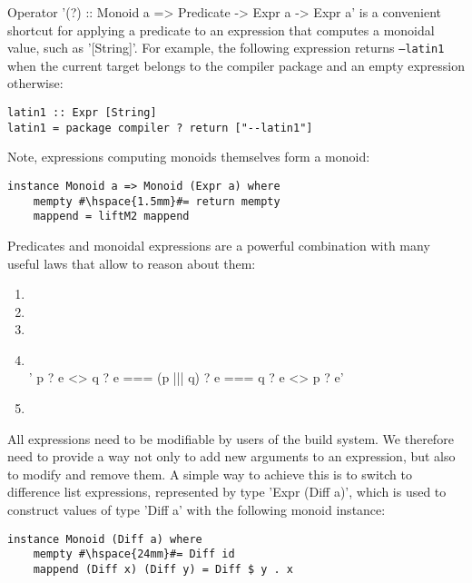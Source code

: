 Operator \lst'(?) :: Monoid a => Predicate -> Expr a -> Expr a' is a
convenient shortcut for applying a predicate to an expression that computes a monoidal value, such
as \lst'[String]'. For example, the following expression returns
\texttt{--latin1} when the current target belongs to the compiler package and an empty expression otherwise:

\begin{lstlisting}
latin1 :: Expr [String]
latin1 = package compiler ? return ["--latin1"]
\end{lstlisting}

\noindent Note, expressions computing monoids themselves form a monoid:

\begin{lstlisting}
instance Monoid a => Monoid (Expr a) where
    mempty #\hspace{1.5mm}#= return mempty
    mappend = liftM2 mappend
\end{lstlisting}

Predicates and monoidal expressions are a powerful combination with many useful
laws that allow to reason about them:
\begin{enumerate}
  \item {} 
  \item {} 
  \item {} 
  \item {}  \vspace{1mm}\\
  \lst'    p ? e <> q ? e === (p ||| q) ? e === q ? e <> p ? e'
  \item {} 
\end{enumerate}

All expressions need to be modifiable by users of the build system. We therefore
need to provide a way not only to add new arguments to an expression, but also
to modify and remove them. A simple way to achieve this is to switch to difference
list expressions, represented by type \lst'Expr (Diff a)', which is used to
construct values of type \lst'Diff a' with the following monoid instance:

\begin{lstlisting}
instance Monoid (Diff a) where
    mempty #\hspace{24mm}#= Diff id
    mappend (Diff x) (Diff y) = Diff $ y . x
\end{lstlisting}

